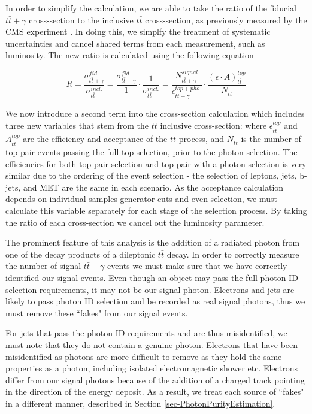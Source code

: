 In order to simplify the calculation, we are able to take the ratio of the fiducial $t\bar{t}+\gamma$ cross-section to the inclusive $t\bar{t}$ cross-section, as previously measured by the CMS experiment \cite{ttbarXsectiondilepton}. In doing this, we simplfy the treatment of systematic uncertainties and cancel shared terms from each measurement, such as luminosity. The new ratio is calculated using the following equation

\begin{equation}
R = \frac{\sigma_{t\bar{t}+\gamma}^{fid.}}{\sigma_{t\bar{t}}^{incl.}} = \frac{\sigma_{t\bar{t}+\gamma}^{fid.}}{1}\cdot\frac{1}{\sigma_{t\bar{t}}^{incl.}} = \frac{N_{t\bar{t}+\gamma}^{signal}}{\epsilon_{t\bar{t}+\gamma}^{top+pho.}} \cdot \frac{(\epsilon \cdot A)_{t\bar{t}}^{top}}{N_{t\bar{t}}}
\end{equation}

We now introduce a second term into the cross-section calculation which includes three new variables that stem from the $t\bar{t}$ inclusive cross-section: where $\epsilon_{t\bar{t}}^{top}$ and $A_{t\bar{t}}^{top}$ are the efficiency and acceptance of the $t\bar{t}$ process, and $N_{t\bar{t}}$ is the number of top pair events passing the full top selection, prior to the photon selection. The efficiencies for both top pair selection and top pair with a photon selection is very similar due to the ordering of the event selection - the selection of leptons, jets, b-jets, and MET are the same in each scenario. As the acceptance calculation depends on individual samples generator cuts and even selection, we must calculate this variable separately for each stage of the selection process. By taking the ratio of each cross-section we cancel out the luminosity parameter.

The prominent feature of this analysis is the addition of a radiated photon from one of the decay products of a dileptonic $t\bar{t}$ decay. In order to correctly measure the number of signal $t\bar{t}+\gamma$ events we must make sure that we have correctly identified our signal events. Even though an object may pass the full photon ID selection requirements, it may not be our signal photon. Electrons and jets are likely to pass photon ID selection and be recorded as real signal photons, thus we must remove these ``fakes" from our signal events.

For jets that pass the photon ID requirements and are thus misidentified, we must note that they do not contain a genuine photon. Electrons that have been misidentified as photons are more difficult to remove as they hold the same properties as a photon, including isolated electromagnetic shower etc. Electrons differ from our signal photons because of the addition of a charged track pointing in the direction of the energy deposit. As a result, we treat each source of ``fakes" in a different manner, described in Section \ref{sec-PhotonPurityEstimation}.



